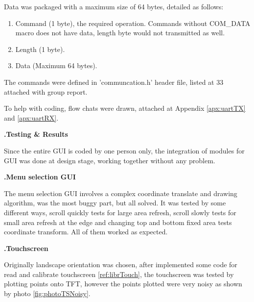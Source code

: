 \documentclass[a4paper,notitlepage,10pt]{report}
\newcommand{\tab}{\hspace{0.75cm}}
\newcommand{\fontHeading}{\fontsize{12pt}{13.2pt}\selectfont}
\newcommand{\fontSubHeading}{\fontsize{10pt}{11pt}\selectfont}
\newcommand{\fontBody}{\fontsize{10pt}{11pt}\selectfont}
\newcounter{sections}
\newcounter{subsections}[sections]
\begin{document}
\begin{multicols}{2}
Data was packaged with a maximum size of 64 bytes, detailed as follows:
\vspace{6pt}

\begin{enumerate}[label={\arabic*)},align=left,leftmargin=0.5cm,labelwidth=!,topsep=0pt,partopsep=0pt,parsep=0pt,itemsep=0pt]
\item Command (1 byte), the required operation. Commands without COM\_DATA macro does not have data, length byte would not transmitted as well.
\item Length (1 byte).
\item Data (Maximum 64 bytes).
\end{enumerate}
\vspace{6pt}

The commands were defined in 'communcation.h' header file, listed at 33 attached with group report.
\vspace{6pt}

To help with coding, flow chats were drawn, attached at Appendix \ref{apx:uartTX} and \ref{apx:uartRX}.
\vspace{10pt}

\fontHeading
{}
\textbf{\thesections.\tab Testing \& Results}
\vspace{10pt}

\fontBody
Since the entire GUI is coded by one person only, the integration of modules for GUI was done at design stage, working together without any problem.
\vspace{6pt}

\fontSubHeading
{}
\textbf{\thesections.\thesubsections\tab Menu selection GUI}
\vspace{6pt}

\fontBody
The menu selection GUI involves a complex coordinate translate and drawing algorithm, was the most buggy part, but all solved. It was tested by some different ways, scroll quickly tests for large area refresh, scroll slowly tests for small area refresh at the edge and changing top and bottom fixed area tests coordinate transform. All of them worked as expected.
\vspace{6pt}

\fontSubHeading
{}
\textbf{\thesections.\thesubsections\tab Touchscreen}
\vspace{6pt}

\fontBody
Originally landscape orientation was chosen, after implemented some code for read and calibrate touchscreen \ref{ref:librTouch}, the touchscreen was tested by plotting points onto TFT, however the points plotted were very noisy as shown by photo \ref{fig:photoTSNoisy}.
\vspace{6pt}


\end{multicols}
\end{document}
